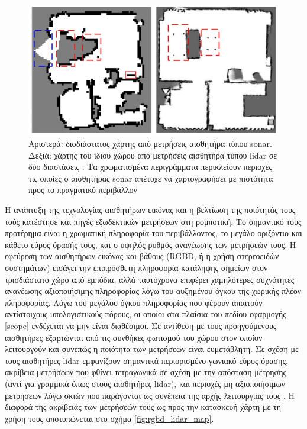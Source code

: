 \begin{figure}\centering
  \includegraphics[scale=0.5]{./figures/parts/01/chapters/01/sections/01/sonar_lidar_map.png}
  \caption{\small Αριστερά: δισδιάστατος χάρτης από μετρήσεις αισθητήρα τύπου sonar.
           Δεξιά: χάρτης του ίδιου χώρου από μετρήσεις αισθητήρα τύπου lidar
           σε δύο διαστάσεις \cite{Qi2020}. Τα χρωματισμένα περιγράμματα
           περικλείουν περιοχές τις οποίες ο αισθητήρας sonar απέτυχε να
           χαρτογραφήσει με πιστότητα προς το πραγματικό περιβάλλον}
  \label{fig:sonar_lidar_map}
\end{figure}

Η ανάπτυξη της τεχνολογίας αισθητήρων εικόνας και η βελτίωση της ποιότητάς τους
τούς κατέστησε και πηγές εξωδεκτικών μετρήσεων στη ρομποτική. Το σημαντικό τους
προτέρημα είναι η χρωματική πληροφορία του περιβάλλοντος, το μεγάλο οριζόντιο
και κάθετο εύρος όρασής τους, και ο υψηλός ρυθμός ανανέωσης των μετρήσεών τους.
Η εφεύρεση των αισθητήρων εικόνας και βάθους (RGBD, ή η χρήση στερεοειδών
συστημάτων) εισάγει την επιπρόσθετη πληροφορία κατάληψης σημείων στον
τρισδιάστατο χώρο από εμπόδια, αλλά ταυτόχρονα επιφέρει χαμηλότερες συχνότητες
ανανέωσης αξιοποιήσιμης πληροφορίας λόγω του αυξημένου όγκου της χωρικής πλέον
πληροφορίας. Λόγω του μεγάλου όγκου πληροφορίας που φέρουν απαιτούν
αντίστοιχους υπολογιστικούς πόρους, οι οποίοι στα πλαίσια του πεδίου εφαρμογής
\ref{scope} ενδέχεται να μην είναι διαθέσιμοι. Σε αντίθεση με τους
προηγούμενους αισθητήρες εξαρτώνται από τις συνθήκες φωτισμού του χώρου στον
οποίον λειτουργούν και συνεπώς η ποιότητα των μετρήσεων είναι ευμετάβλητη. Σε
σχέση με τους αισθητήρες lidar εμφανίζουν σημαντικά περιορισμένο γωνιακό εύρος
όρασης, ακρίβεια μετρήσεων που φθίνει τετραγωνικά σε σχέση με την απόσταση
μέτρησης (αντί για γραμμικά όπως στους αισθητήρες lidar), και περιοχές μη
αξιοποιήσιμων μετρήσεων λόγω σκιών που παράγονται ως συνέπεια της αρχής
λειτουργίας τους \cite{Mallick2014}. Η διαφορά της ακρίβειάς των μετρήσεών τους
ως προς την κατασκευή χάρτη με τη χρήση τους αποτυπώνεται στο σχήμα
\ref{fig:rgbd_lidar_map}.

